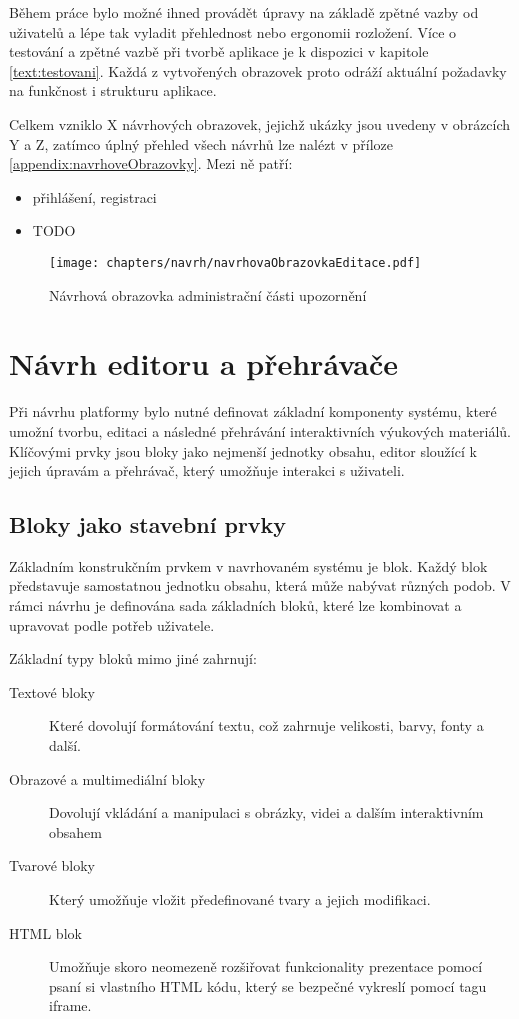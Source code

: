 Během práce bylo možné ihned provádět úpravy na základě zpětné vazby od uživatelů a lépe tak vyladit přehlednost nebo ergonomii rozložení. 
Více o testování a zpětné vazbě při tvorbě aplikace je k dispozici v kapitole \ref{text:testovani}.
Každá z vytvořených obrazovek proto odráží aktuální požadavky na funkčnost i strukturu aplikace.


Celkem vzniklo X návrhových obrazovek, jejichž ukázky jsou uvedeny v obrázcích Y a Z, zatímco úplný přehled všech návrhů lze nalézt v příloze \ref{appendix:navrhoveObrazovky}.
Mezi ně patří:

\begin{itemize}
    \item přihlášení, registraci
    \item TODO
\end{itemize}

\begin{figure}[ht!]
    \centering
    \texttt{[image: chapters/navrh/navrhovaObrazovkaEditace.pdf]}
    \caption{Návrhová obrazovka administrační části upozornění}\label{fig:navrhovaObrazovkaEditaceAdministrace}
\end{figure}


\section{Návrh editoru a přehrávače}\label{text:navrh/editor_player}

Při návrhu platformy bylo nutné definovat základní komponenty systému, které umožní tvorbu, editaci a následné přehrávání interaktivních výukových materiálů. 
Klíčovými prvky jsou bloky jako nejmenší jednotky obsahu, editor sloužící k jejich úpravám a přehrávač, který umožňuje interakci s uživateli.

\subsection{Bloky jako stavební prvky}

Základním konstrukčním prvkem v navrhovaném systému je blok. 
Každý blok představuje samostatnou jednotku obsahu, která může nabývat různých podob. 
V rámci návrhu je definována sada základních bloků, které lze kombinovat a upravovat podle potřeb uživatele.

Základní typy bloků mimo jiné zahrnují:

\begin{description}
    \item[Textové bloky] Které dovolují formátování textu, což zahrnuje velikosti, barvy, fonty a další.
    \item[Obrazové a multimediální bloky] Dovolují vkládání a manipulaci s obrázky, videi a dalším interaktivním obsahem
    \item[Tvarové bloky] Který umožňuje vložit předefinované tvary a jejich modifikaci.
    \item[HTML blok] Umožňuje skoro neomezeně rozšiřovat funkcionality prezentace pomocí psaní si vlastního HTML kódu, který se bezpečné vykreslí pomocí tagu iframe.
\end{description}


